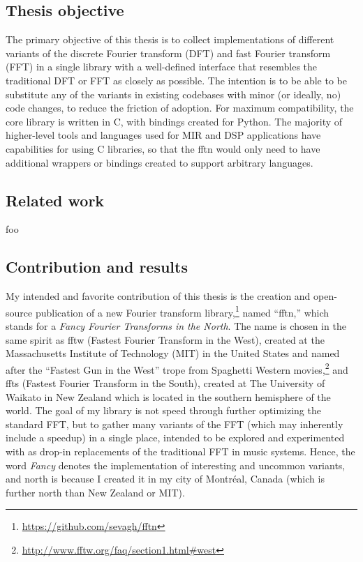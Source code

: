 \documentclass[letter,12pt]{article}
\begin{document}
\subsection{Thesis objective}

The primary objective of this thesis is to collect implementations of different variants of the discrete Fourier transform (DFT) and fast Fourier transform (FFT) in a single library with a well-defined interface that resembles the traditional DFT or FFT as closely as possible. The intention is to be able to be substitute any of the variants in existing codebases with minor (or ideally, no) code changes, to reduce the friction of adoption. For maximum compatibility, the core library is written in C, with bindings created for Python. The majority of higher-level tools and languages used for MIR and DSP applications have capabilities for using C libraries, so that the fftn would only need to have additional wrappers or bindings created to support arbitrary languages. 

\subsection{Related work}

foo

\subsection{Contribution and results}

My intended and favorite contribution of this thesis is the creation and open-source publication of a new Fourier transform library,\footnote{\href{https://github.com/sevagh/fftn}{https://github.com/sevagh/fftn}} named ``fftn,'' which stands for a \textit{Fancy Fourier Transforms in the North}. The name is chosen in the same spirit as fftw\cite{fftw} (Fastest Fourier Transform in the West), created at the Massachusetts Institute of Technology (MIT) in the United States and named after the ``Fastest Gun in the West'' trope from Spaghetti Western movies,\footnote{\href{http://www.fftw.org/faq/section1.html\#west}{http://www.fftw.org/faq/section1.html\#west}} and ffts\cite{ffts} (Fastest Fourier Transform in the South), created at The University of Waikato in New Zealand which is located in the southern hemisphere of the world. The goal of my library is not speed through further optimizing the standard FFT, but to gather many variants of the FFT (which may inherently include a speedup) in a single place, intended to be explored and experimented with as drop-in replacements of the traditional FFT in music systems. Hence, the word \textit{Fancy} denotes the implementation of interesting and uncommon variants, and north is because I created it in my city of Montr{\'e}al, Canada (which is further north than New Zealand or MIT).
\end{document}
